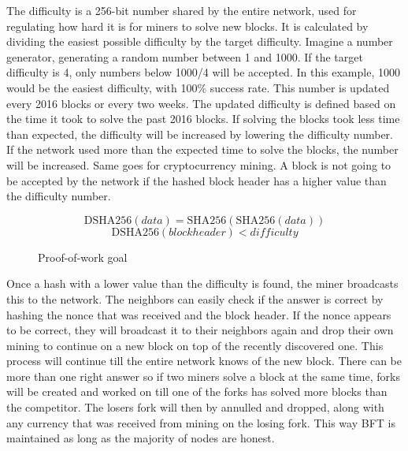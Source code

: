 \documentclass[11pt]{article}
\begin{document}
The difficulty is a 256-bit number shared by the entire network, used for regulating how hard it is for miners to solve new blocks. It is calculated by dividing the easiest possible difficulty by the target difficulty. Imagine a number generator, generating a random number between 1 and 1000. If the target difficulty is 4, only numbers below 1000/4 will be accepted. In this example, 1000 would be the easiest difficulty, with 100\% success rate. This number is updated every 2016 blocks or every two weeks. The updated difficulty is defined based on the time it took to solve the past 2016 blocks. If solving the blocks took less time than expected, the difficulty will be increased by lowering the difficulty number. If the network used more than the expected time to solve the blocks, the number will be increased. Same goes for cryptocurrency mining. A block is not going to be accepted by the network if the hashed block header has a higher value than the difficulty number. 

\begin{figure}[h!]
\begin{equation*}
\textrm{DSHA256}(\mathit{data}) = \textrm{SHA256}(\textrm{SHA256}(\mathit{data}))
\end{equation*}
\begin{equation*}
\textrm{DSHA256}(\mathit{blockheader}) < \mathit{difficulty}
\end{equation*}
\caption{Proof-of-work goal}
\end{figure}

Once a hash with a lower value than the difficulty is found, the miner broadcasts this to the network. The neighbors can easily check if the answer is correct by hashing the nonce that was received and the block header. If the nonce appears to be correct, they will broadcast it to their neighbors again and drop their own mining to continue on a new block on top of the recently discovered one. This process will continue till the entire network knows of the new block. There can be more than one right answer so if two miners solve a block at the same time, forks will be created and worked on till one of the forks has solved more blocks than the competitor. The losers fork will then by annulled and dropped, along with any currency that was received from mining on the losing fork. This way BFT is maintained as long as the majority of nodes are honest.
\end{document}
